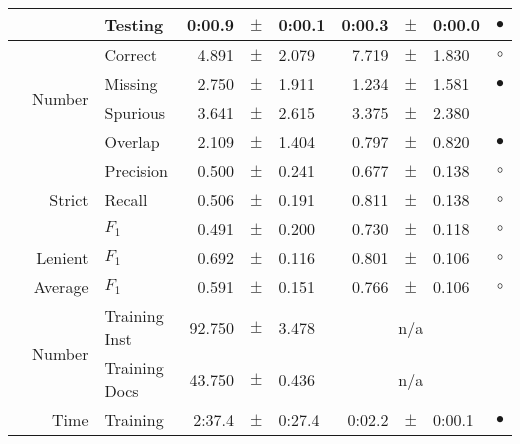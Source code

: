 \begin{longtable}{|r|r|l||rcl|rcl|c|}
\cline{3-10} &                             &         Testing &      0:00.9 &  $\pm$  &      0:00.1 &      0:00.3 &  $\pm$  &      0:00.0 & $\bullet$ \\
\hline
\pagebreak
\hline
\hline
\multirow{11}{*}{\begin{sideways}profesional unit\end{sideways} }
             & \multirow{4}{*}{    Number} &         Correct &       4.891 &  $\pm$  &       2.079 &       7.719 &  $\pm$  &       1.830 & $\circ$ \\
\cline{3-10} &                             &         Missing &       2.750 &  $\pm$  &       1.911 &       1.234 &  $\pm$  &       1.581 & $\bullet$ \\
\cline{3-10} &                             &        Spurious &       3.641 &  $\pm$  &       2.615 &       3.375 &  $\pm$  &       2.380 &  \\
\cline{3-10} &                             &         Overlap &       2.109 &  $\pm$  &       1.404 &       0.797 &  $\pm$  &       0.820 & $\bullet$ \\
\cline{2-10} & \multirow{3}{*}{    Strict} &       Precision &       0.500 &  $\pm$  &       0.241 &       0.677 &  $\pm$  &       0.138 & $\circ$ \\
\cline{3-10} &                             &          Recall &       0.506 &  $\pm$  &       0.191 &       0.811 &  $\pm$  &       0.138 & $\circ$ \\
\cline{3-10} &                             &           $F_1$ &       0.491 &  $\pm$  &       0.200 &       0.730 &  $\pm$  &       0.118 & $\circ$ \\
\cline{2-10} &                     Lenient &           $F_1$ &       0.692 &  $\pm$  &       0.116 &       0.801 &  $\pm$  &       0.106 & $\circ$ \\
\cline{2-10} &                     Average &           $F_1$ &       0.591 &  $\pm$  &       0.151 &       0.766 &  $\pm$  &       0.106 & $\circ$ \\
\cline{2-10} & \multirow{2}{*}{    Number} &   Training Inst &      92.750 &  $\pm$  &       3.478 &    \multicolumn{3}{c|}{n/a}         &  \\
\cline{3-10} &                             &   Training Docs &      43.750 &  $\pm$  &       0.436 &    \multicolumn{3}{c|}{n/a}         &  \\
\cline{2-10} & \multirow{2}{*}{      Time} &        Training &      2:37.4 &  $\pm$  &      0:27.4 &      0:02.2 &  $\pm$  &      0:00.1 & $\bullet$ \\

\end{longtable}
